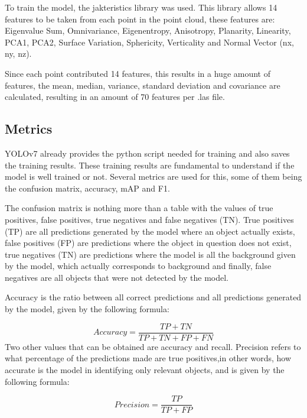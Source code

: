 To train the model, the jakteristics library\cite{jakteristics} was used. This library allows 14 features to be taken from each point in the point cloud, these features are: Eigenvalue Sum, Omnivariance, Eigenentropy, Anisotropy, Planarity, Linearity, PCA1, PCA2, Surface Variation, Sphericity, Verticality and Normal Vector (nx, ny, nz).

Since each point contributed 14 features, this results in a huge amount of features, the mean, median, variance, standard deviation and covariance are calculated, resulting in an amount of 70 features per .las file.



\subsection{Metrics}

YOLOv7 already provides the python script needed for training and also saves the training results. These training results are fundamental to understand if the model is well trained or not. Several metrics are used for this, some of them being the confusion matrix, accuracy, mAP and F1.

The confusion matrix is nothing more than a table with the values of true positives, false positives, true negatives and false negatives (TN). True positives (TP) are all predictions generated by the model where an object actually exists, false positives (FP) are predictions where the object in question does not exist, true negatives (TN) are predictions where the model is all the background given by the model, which actually corresponds to background and finally, false negatives are all objects that were not detected by the model.

Accuracy is the ratio between all correct predictions and all predictions generated by the model, given by the following formula:

\begin{equation}
     Accuracy = \frac{TP + TN}{TP + TN + FP + FN}
\end{equation}
Two other values that can be obtained are accuracy and recall\cite{yoloMetrics}. Precision refers to what percentage of the predictions made are true positives,in other words, how accurate is the model in identifying only relevant objects, and is given by the following formula:

\begin{equation}
     Precision = \frac{TP }{TP + FP}
\end{equation}

